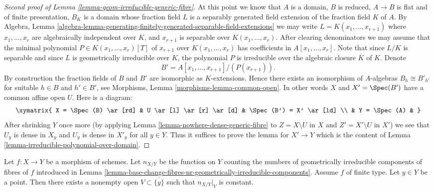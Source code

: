 \begin{proof}[Second proof of Lemma \ref{lemma-geom-irreducible-generic-fibre}]
\medskip\noindent
At this point we know that $A$ is a domain, $B$ is reduced, $A \to B$
is flat and of finite presentation, $B_K$ is a domain whose fraction field
$L$ is a separably generated field extension of the fraction field $K$
of $A$. By Algebra, Lemma
\ref{algebra-lemma-generating-finitely-generated-separable-field-extensions}
we may write $L = K(x_1, \ldots, x_{r + 1})$
where $x_1, \ldots, x_r$ are algebraically independent over $K$, and
$x_{r + 1}$ is separable over $K(x_1, \ldots, x_r)$. After clearing
denominators we may assume that the minimal polynomial
$P \in K(x_1, \ldots, x_r)[T]$ of $x_{r + 1}$ over $K(x_1, \ldots, x_r)$
has coefficients in $A[x_1, \ldots, x_r]$. Note that since
$L/K$ is separable and since $L$ is geometrically irreducible over
$K$, the polynomial $P$ is irreducible over the algebraic closure
$\overline{K}$ of $K$. Denote
$$
B' = A[x_1, \ldots, x_{r + 1}]/(P(x_{r + 1})).
$$
By construction the fraction fields of $B$ and $B'$ are isomorphic as
$K$-extensions. Hence there exists an isomorphism of $A$-algebras
$B_h \cong B'_{h'}$ for suitable $h \in B$ and $h' \in B'$, see
Morphisms, Lemma \ref{morphisms-lemma-common-open}.
In other words $X$ and $X' = \Spec(B')$ have a common affine open $U$.
Here is a diagram:
$$
\xymatrix{
X = \Spec(B) \ar[rd] &
U \ar[l] \ar[r] \ar[d] &
\Spec(B') = X' \ar[ld] \\
& Y = \Spec(A) &
}
$$
After shrinking $Y$ once more (by applying
Lemma \ref{lemma-nowhere-dense-generic-fibre}
to $Z = X \setminus U$ in $X$ and $Z' = X' \setminus U$ in $X'$)
we see that $U_y$ is dense in $X_y$ and $U_y$ is dense in $X'_y$
for all $y \in Y$. Thus it suffices to prove the lemma for
$X' \to Y$ which is the content of
Lemma \ref{lemma-irreducible-polynomial-over-domain}.
\end{proof}

\begin{lemma}
\label{lemma-nr-geom-irreducible-components-good}
Let $f : X \to Y$ be a morphism of schemes. Let
$n_{X/Y}$ be the function on $Y$ counting the numbers of geometrically
irreducible components of fibres of $f$ introduced in
Lemma \ref{lemma-base-change-fibres-nr-geometrically-irreducible-components}.
Assume $f$ of finite type.
Let $y \in Y$ be a point. Then there exists a nonempty open
$V \subset \overline{\{y\}}$ such that $n_{X/Y}|_V$ is constant.
\end{lemma}

